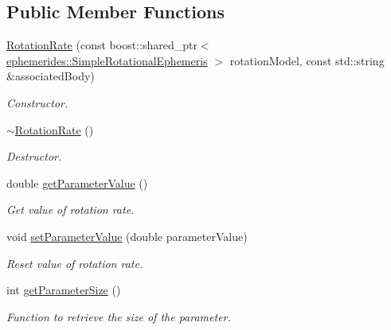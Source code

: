 \subsection*{Public Member Functions}
\begin{DoxyCompactItemize}
\item 
\hyperlink{classtudat_1_1estimatable__parameters_1_1RotationRate_ab3f55bd46e3f115a2b39453fdce8ec22}{Rotation\+Rate} (const boost\+::shared\+\_\+ptr$<$ \hyperlink{classtudat_1_1ephemerides_1_1SimpleRotationalEphemeris}{ephemerides\+::\+Simple\+Rotational\+Ephemeris} $>$ rotation\+Model, const std\+::string \&associated\+Body)
\begin{DoxyCompactList}\small\item\em Constructor. \end{DoxyCompactList}\item 
\hyperlink{classtudat_1_1estimatable__parameters_1_1RotationRate_af282dfdb148c288b937abc6a3df6562d}{$\sim$\+Rotation\+Rate} ()\hypertarget{classtudat_1_1estimatable__parameters_1_1RotationRate_af282dfdb148c288b937abc6a3df6562d}{}\label{classtudat_1_1estimatable__parameters_1_1RotationRate_af282dfdb148c288b937abc6a3df6562d}

\begin{DoxyCompactList}\small\item\em Destructor. \end{DoxyCompactList}\item 
double \hyperlink{classtudat_1_1estimatable__parameters_1_1RotationRate_ac024f33645b293e73cb610f402e7a7ee}{get\+Parameter\+Value} ()
\begin{DoxyCompactList}\small\item\em Get value of rotation rate. \end{DoxyCompactList}\item 
void \hyperlink{classtudat_1_1estimatable__parameters_1_1RotationRate_afad73852fa105de2616b9be5c607f489}{set\+Parameter\+Value} (double parameter\+Value)
\begin{DoxyCompactList}\small\item\em Reset value of rotation rate. \end{DoxyCompactList}\item 
int \hyperlink{classtudat_1_1estimatable__parameters_1_1RotationRate_a9d0c87adc47873d0b8ec3fc59408fa03}{get\+Parameter\+Size} ()
\begin{DoxyCompactList}\small\item\em Function to retrieve the size of the parameter. \end{DoxyCompactList}\end{DoxyCompactItemize}
